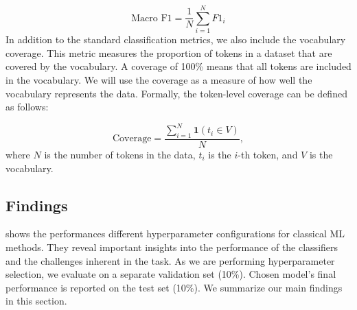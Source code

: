 \begin{equation} 
    \text{Macro F1} = \frac{1}{N} \sum_{i=1}^{N} F1_i
\end{equation}
In addition to the standard classification metrics, we also include the vocabulary coverage. This metric measures the proportion of tokens in a dataset that are covered by the vocabulary. A coverage of 100\% means that all tokens are included in the vocabulary. We will use the coverage as a measure of how well the vocabulary represents the data. Formally, the token-level coverage can be defined as follows:

\begin{equation}
    \text{Coverage} = \frac{\sum_{i=1}^{N} \mathbf{1} (t_i \in V)}{N},
\end{equation}
where $N$ is the number of tokens in the data, $t_i$ is the $i$-th token, and $V$ is the vocabulary.
 
\subsection{Findings}
 shows the performances different hyperparameter configurations for classical ML methods. They reveal important insights into the performance of the classifiers and the challenges inherent in the task. As we are performing hyperparameter selection, we evaluate on a separate validation set (10\%). Chosen model's final performance is reported on the test set (10\%). 
We summarize our main findings in this section.

